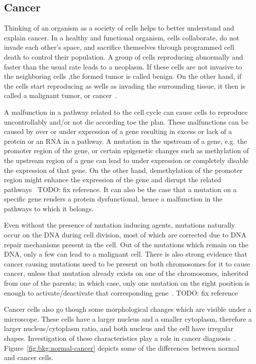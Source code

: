 \subsection{Cancer}
\label{sec:bkg:cancer}
Thinking of an organism as a society of cells helps to better understand and explain cancer. In a healthy and functional organism, cells collaborate, do not invade each other's space, and sacrifice themselves through programmed cell death to control their population. A group of cells reproducing abnormally and faster than the usual rate leads to a neoplasm. If these cells are not invasive to the neighboring cells ,the formed tumor is called benign. On the other hand, if the cells start reproducing as wells as invading the surrounding tissue, it then is called a malignant tumor, or cancer~\cite[Ch. 20]{the-cell}.

A malfunction in a pathway related to the cell cycle can cause cells to reproduce uncontrollably and/or not die according toe the plan. These malfunctions can be caused by over or under expression of a gene resulting in excess or lack of a protein or an RNA in a pathway. A mutation in the upstream of a gene, e.g. the promoter region of the gene, or certain epigenetic changes such as methylation of the upstream region of a gene can lead to under expression or completely disable the expression of that gene. On the other hand, demethylation of the promoter region might enhance the expression of the gene and disrupt the related pathways~\cite{methylation-cancer} TODO: fix reference. It can also be the case that a mutation on a specific gene renders a protein dysfunctional, hence a malfunction in the pathways to which it belongs.

Even without the presence of mutation inducing agents, mutations naturally occur on the DNA during cell division, most of which are corrected due to DNA repair mechanisms present in the cell. Out of the mutations which remain on the DNA, only a few can lead to a malignant cell. There is also strong evidence that cancer causing mutations need to be present on both chromosomes for it to cause cancer, unless that mutation already exists on one of the chromosomes, inherited from one of the parents; in which case, only one mutation on the right position is enough to activate/deactivate that corresponding gene~\cite{mutation-both-chromosomes}. TODO: fix reference 

Cancer cells also go though some morphological changes which are visible under a microscope. These cells have a larger nucleus and a smaller cytoplasm, therefore a larger nucleus/cytoplasm ratio, and both nucleus and the cell have irregular shapes. Investigation of these characteristics play a role in cancer diagnosis~\cite{baba2007tumor}. Figure~\ref{fig:bkg:normal-cancer} depicts some of the differences between normal and cancer cells.

